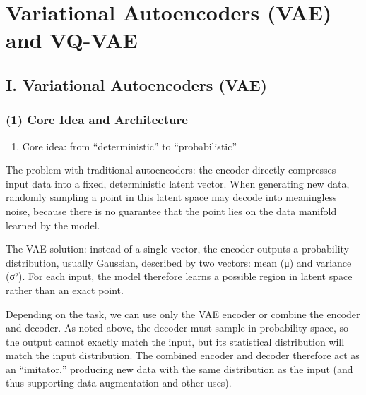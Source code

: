 \setcounter{section}{2}

\hypertarget{variational-autoencoders-vae-and-vq-vae}{%
\section{Variational Autoencoders (VAE) and VQ-VAE}\label{variational-autoencoders-vae-and-vq-vae}}

\hypertarget{i.-variational-autoencoders-vae}{%
\subsection{I. Variational Autoencoders (VAE)}\label{i.-variational-autoencoders-vae}}

\hypertarget{core-idea-and-architecture}{%
\subsubsection{(1) Core Idea and Architecture}\label{core-idea-and-architecture}}

\begin{enumerate}
\def\labelenumi{\arabic{enumi}.}
\tightlist
\item
  Core idea: from ``deterministic'' to ``probabilistic''
\end{enumerate}

The problem with traditional autoencoders: the encoder directly compresses input data into a fixed, deterministic latent vector. When generating new data, randomly sampling a point in this latent space may decode into meaningless noise, because there is no guarantee that the point lies on the data manifold learned by the model.

The VAE solution: instead of a single vector, the encoder outputs a probability distribution, usually Gaussian, described by two vectors: mean (μ) and variance (σ²). For each input, the model therefore learns a possible region in latent space rather than an exact point.

Depending on the task, we can use only the VAE encoder or combine the encoder and decoder. As noted above, the decoder must sample in probability space, so the output cannot exactly match the input, but its statistical distribution will match the input distribution. The combined encoder and decoder therefore act as an ``imitator,'' producing new data with the same distribution as the input (and thus supporting data augmentation and other uses).

